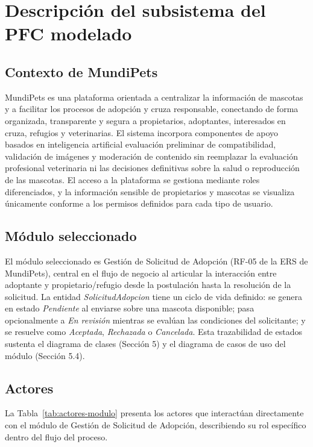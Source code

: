 \documentclass[journal,onecolumn]{IEEEtran}
\begin{document}
\section{Descripción del subsistema del PFC modelado}
\subsection{Contexto de MundiPets}
MundiPets es una plataforma orientada a centralizar la información de mascotas y a facilitar los procesos de adopción y cruza responsable, conectando de forma organizada, transparente y segura a propietarios, adoptantes, interesados en cruza, refugios y veterinarias. El sistema incorpora componentes de apoyo basados en inteligencia artificial evaluación preliminar de compatibilidad, validación de imágenes y moderación de contenido sin reemplazar la evaluación profesional veterinaria ni las decisiones definitivas sobre la salud o reproducción de las mascotas. El acceso a la plataforma se gestiona mediante roles diferenciados, y la información sensible de propietarios y mascotas se visualiza únicamente conforme a los permisos definidos para cada tipo de usuario.
\subsection{Módulo seleccionado}
El módulo seleccionado es Gestión de Solicitud de Adopción (RF-05 de la ERS de MundiPets), central en el flujo de negocio al articular la interacción entre adoptante y propietario/refugio desde la postulación hasta la resolución de la solicitud.
La entidad \textit{SolicitudAdopcion} tiene un ciclo de vida definido: se genera en estado \textit{Pendiente} al enviarse sobre una mascota disponible; pasa opcionalmente a \textit{En revisión} mientras se evalúan las condiciones del solicitante; y se resuelve como \textit{Aceptada}, \textit{Rechazada} o \textit{Cancelada}. Esta trazabilidad de estados sustenta el diagrama de clases (Sección 5) y el diagrama de casos de uso del módulo (Sección 5.4).

\subsection{Actores}

La Tabla~\ref{tab:actores-modulo} presenta los actores que interactúan directamente con el módulo de Gestión de Solicitud de Adopción, describiendo su rol específico dentro del flujo del proceso.
\end{document}

